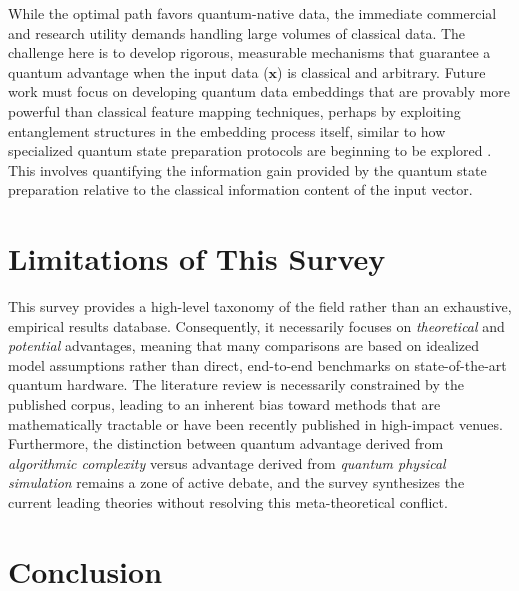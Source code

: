\documentclass{article}
\begin{document}
\label{sec:challenge_5\_bridging\_quantum\_computation}

While the optimal path favors quantum-native data, the immediate commercial and research utility demands handling large volumes of classical data. The challenge here is to develop rigorous, measurable mechanisms that guarantee a quantum advantage when the input data ($\mathbf{x}$) is classical and arbitrary. Future work must focus on developing quantum data embeddings that are provably more powerful than classical feature mapping techniques, perhaps by exploiting entanglement structures in the embedding process itself, similar to how specialized quantum state preparation protocols are beginning to be explored \cite{shukla2024efficient}. This involves quantifying the information gain provided by the quantum state preparation relative to the classical information content of the input vector.

\section{Limitations of This Survey}

\label{sec:limitations\_of\_this\_survey}

This survey provides a high-level taxonomy of the field rather than an exhaustive, empirical results database. Consequently, it necessarily focuses on \textit{theoretical} and \textit{potential} advantages, meaning that many comparisons are based on idealized model assumptions rather than direct, end-to-end benchmarks on state-of-the-art quantum hardware. The literature review is necessarily constrained by the published corpus, leading to an inherent bias toward methods that are mathematically tractable or have been recently published in high-impact venues. Furthermore, the distinction between quantum advantage derived from \textit{algorithmic complexity} versus advantage derived from \textit{quantum physical simulation} remains a zone of active debate, and the survey synthesizes the current leading theories without resolving this meta-theoretical conflict.

\section{Conclusion}

\label{sec:conclusion}
\end{document}
